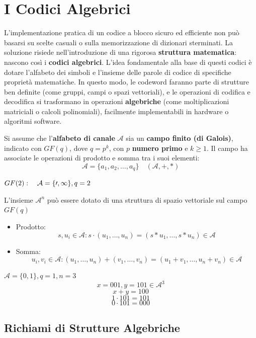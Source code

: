 \section{I Codici Algebrici}
L'implementazione pratica di un codice a blocco sicuro ed efficiente non può basarsi su scelte casuali o sulla memorizzazione di dizionari sterminati. La soluzione risiede nell'introduzione di una rigorosa \textbf{struttura matematica}: nascono così i \textbf{codici algebrici}.
L'idea fondamentale alla base di questi codici è dotare l'alfabeto dei simboli e l'insieme delle parole di codice di specifiche proprietà matematiche.
In questo modo, le codeword faranno parte di strutture ben definite (come gruppi, campi o spazi vettoriali), e le operazioni di codifica e decodifica si trasformano in operazioni \textbf{algebriche} (come moltiplicazioni matriciali o calcoli polinomiali), facilmente implementabili in hardware o algoritmi software.

Si assume che l'\textbf{alfabeto di canale} $\mathcal{A}$ sia un \textbf{campo finito (di Galois)}, indicato con $GF(q)$, dove $q=p^k$, con $p$ \textbf{numero primo} e $k \geq 1$. Il campo ha associate le operazioni di prodotto e somma tra i suoi elementi:
\[\mathcal{A}=\{a_1,a_2,\dots,a_q\} \quad (\mathcal{A},+,*)\]

\begin{esempio}{$GF(2):\quad \mathcal{A=\{0,1\}}, \space q=2$}

\end{esempio}

L'insieme $\mathcal{A}^n$ può essere dotato di una struttura di spazio vettoriale sul campo $GF(q)$
\begin{itemize}
    \item Prodotto:
    \[s,u_i \in \mathcal{A}: s \cdot(u_1,\dots,u_n) =  (s*u_1,\dots, s*u_n) \in\mathcal{A}\]
    \item Somma:
    \[u_i,v_i \in \mathcal{A}:(u_1,\dots,u_n)+(v_1,\dots,v_n)= (u_1+v_1,\dots,u_n+v_n)\in \mathcal{A}\]
\end{itemize}

\begin{esempio}{$\mathcal{A}= \{0,1\},q=1,n=3$}
\[x= 001,y=101 \in \mathcal{A}^3\]
\[x+y= 100\]
\[1 \cdot 101 = 101\]
\[0 \cdot 101 = 000\]

\end{esempio}

\subsection{Richiami di Strutture Algebriche}


